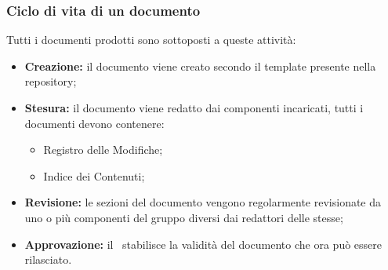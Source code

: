 \subsubsection{Ciclo di vita di un documento}\label{CicloDocumentazione}
Tutti i documenti prodotti sono sottoposti a queste attività:
\begin{itemize}
	\item \textbf{Creazione: }il documento viene creato secondo il template presente nella repository;
	\item \textbf{Stesura: }il documento viene redatto dai componenti incaricati, tutti i documenti devono contenere:
	\begin{itemize}
		\item Registro delle Modifiche;
		\item Indice dei Contenuti;
	\end{itemize}
	\item \textbf{Revisione: }le sezioni del documento vengono regolarmente revisionate da uno o più componenti del gruppo diversi dai redattori delle stesse;
	\item \textbf{Approvazione: }il \Responsabile\ stabilisce la validità del documento che ora può essere rilasciato. 
\end{itemize}

